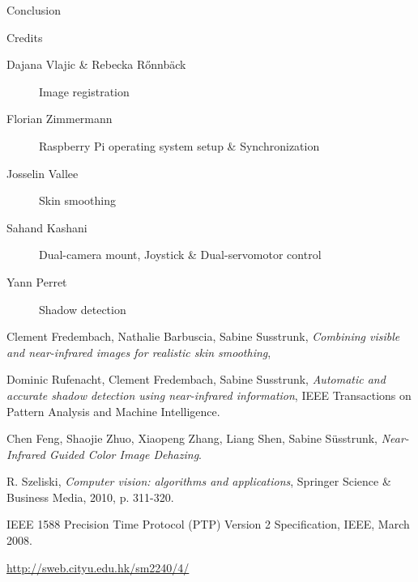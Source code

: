 \documentclass[11pt]{article}
\begin{document}
\newpage

\begin{section}{Conclusion}
    \label{sec:conclusion}
\end{section}

\begin{section}{Credits}
    \begin{description}
        \item [Dajana Vlajic \& Rebecka R{\H o}nnb{\"a}ck] Image registration
        \item [Florian Zimmermann] Raspberry Pi operating system setup \& Synchronization
        \item [Josselin Vallee] Skin smoothing
        \item [Sahand Kashani] Dual-camera mount, Joystick \& Dual-servomotor control
        \item [Yann Perret] Shadow detection
    \end{description}
\end{section}

\begin{thebibliography}{9}

    Clement Fredembach, Nathalie Barbuscia, Sabine Susstrunk,
    \emph{Combining visible and near-infrared images for realistic skin smoothing},

    Dominic Rufenacht, Clement Fredembach, Sabine Susstrunk,
    \emph{Automatic and accurate shadow detection using near-infrared information},
    IEEE Transactions on Pattern Analysis and Machine Intelligence.

    Chen Feng, Shaojie Zhuo, Xiaopeng Zhang, Liang Shen, Sabine Süsstrunk,
    \emph{Near-Infrared Guided Color Image Dehazing}.

    R. Szeliski,
    \emph{Computer vision: algorithms and applications},
    Springer Science \& Business Media, 2010, p. 311-320.

    {IEEE 1588 Precision Time Protocol (PTP) Version 2 Specification},
    IEEE,
    March 2008.

    \url{http://sweb.cityu.edu.hk/sm2240/4/}

\end{thebibliography}
\end{document}
